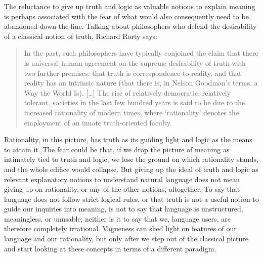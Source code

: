 \documentclass[a4paper]{article}
\begin{document}
The reluctance to give up truth and logic as valuable notions to explain meaning is perhaps associated with the fear of what would also consequently need to be abandoned down the line.
Talking about philosophers who defend the desirability of a classical notion of truth, Richard Rorty says:
\begin{quote}
In the past, such philosophers have typically conjoined the claim that there is universal human agreement on the supreme desirability of truth with two further premises: that truth is correspondence to reality, and that reality has an intrinsic nature (that there is, in Nelson Goodman's terms, a Way the World Is).
[\ldots]
The rise of relatively democratic, relatively tolerant, societies in the last few hundred years is said to be due to the increased rationality of modern times, where `rationality' denotes the employment of an innate truth-oriented faculty.%
~\parencite*[1]{rorty_response_2000-1}
\end{quote}
Rationality, in this picture, has truth as its guiding light and logic as the means to attain it.
The fear could be that, if we drop the picture of meaning as intimately tied to truth and logic, we lose the ground on which rationality stands, and the whole edifice would collapse.
But giving up the ideal of truth and logic as relevant explanatory notions to understand natural language does not mean giving up on rationality, or any of the other notions, altogether.
To say that language does not follow strict logical rules, or that truth is not a useful notion to guide our inquiries into meaning, is not to say that language is unstructured, meaningless, or unusable; neither is it to say that we, language users, are therefore completely irrational.
Vagueness can shed light on features of our language and our rationality, but only after we step out of the classical picture and start looking at these concepts in terms of a different paradigm.
\end{document}

